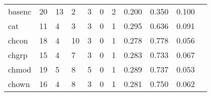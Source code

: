 \begin{longtable}{lp{1.2cm}p{1.2cm}p{1.2cm}p{1.2cm}p{1.2cm}p{1.2cm}p{1.2cm}p{1.2cm}p{1.2cm}p{1.2cm}}
basenc    &                                    20 &                                                 13 &                                                  2 &                                                  3 &                                                  0 &                                                  2 &                                              0.200 &                                              0.350 &                                              0.100 \\
cat       &                                    11 &                                                  4 &                                                  3 &                                                  3 &                                                  0 &                                                  1 &                                              0.295 &                                              0.636 &                                              0.091 \\
chcon     &                                    18 &                                                  4 &                                                 10 &                                                  3 &                                                  0 &                                                  1 &                                              0.278 &                                              0.778 &                                              0.056 \\
chgrp     &                                    15 &                                                  4 &                                                  7 &                                                  3 &                                                  0 &                                                  1 &                                              0.283 &                                              0.733 &                                              0.067 \\
chmod     &                                    19 &                                                  5 &                                                  8 &                                                  5 &                                                  0 &                                                  1 &                                              0.289 &                                              0.737 &                                              0.053 \\
chown     &                                    16 &                                                  4 &                                                  8 &                                                  3 &                                                  0 &                                                  1 &                                              0.281 &                                              0.750 &                                              0.062 \\

\end{longtable}
